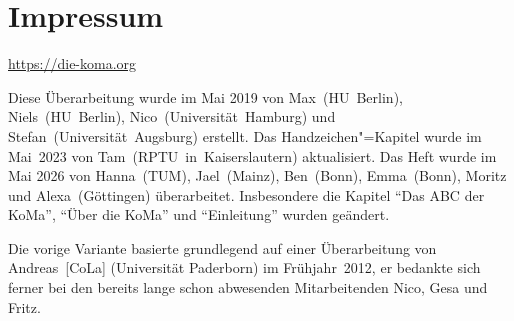 \chapter{Impressum}


\begin{center}
    \url{https://die-koma.org}
\end{center}

\vspace{2em}

\noindent Diese Überarbeitung wurde im Mai 2019 von \mbox{Max (HU Berlin)}, \mbox{Niels (HU Berlin)}, \mbox{Nico (Universität Hamburg)} und \mbox{Stefan (Universität Augsburg)} erstellt.
Das  Handzeichen"=Kapitel wurde im Mai~2023 von \mbox{Tam (RPTU in Kaiserslautern)} aktualisiert.
Das Heft wurde im Mai 2026 von \mbox{Hanna (TUM)}, \mbox{Jael (Mainz)}, \mbox{Ben (Bonn)}, \mbox{Emma (Bonn)}, \mbox{Moritz} und \mbox{Alexa (Göttingen)} überarbeitet. Insbesondere die Kapitel \enquote{Das ABC der KoMa}, \enquote{Über die KoMa} und \enquote{Einleitung} wurden geändert.
\vspace{1em}

\noindent Die vorige Variante basierte grundlegend auf einer Überarbeitung von \mbox{Andreas [CoLa]} (Universität Paderborn) im Frühjahr~2012, er bedankte sich ferner bei den bereits lange schon abwesenden Mitarbeitenden Nico, Gesa und Fritz.
